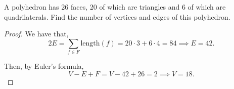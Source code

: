 \documentclass[../hw7]{subfiles}
\begin{document}
\begin{problem}
\item A polyhedron has 26 faces, 20 of which are triangles and 6 of which are quadrilaterals. Find the number of vertices and edges of this polyhedron.
\end{problem}
\begin{proof}
	We have that, \[
		2E = \sum_{f\in F} \text{length}(f) = 20\cdot 3 + 6\cdot 4 = 84 \implies E = 42
		.\]

	Then, by Euler's formula, \[
		V-E+F = V-42+26=2 \implies V = 18
		.\]
\end{proof}
\end{document}
